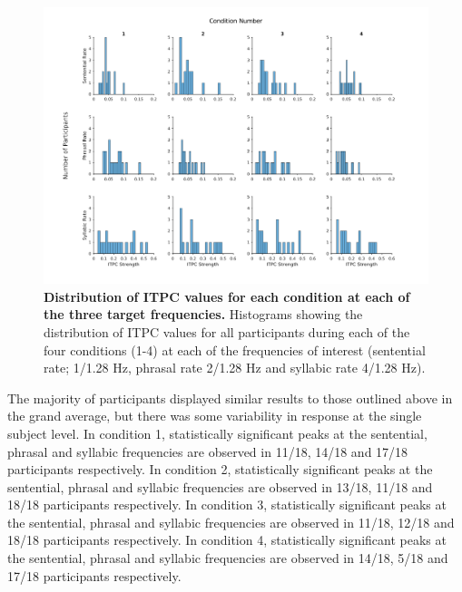 \documentclass[10pt,letterpaper]{article}
\begin{document}

\begin{figure}[tbhp]
\includegraphics[width=\linewidth]{ITPC_Distributions.png}
\caption{\textbf{Distribution of ITPC values for each condition at each of the three target frequencies.} Histograms showing the distribution of ITPC values for all participants during each of the four conditions (1-4) at each of the frequencies of interest (sentential rate; 1/1.28 Hz, phrasal rate 2/1.28 Hz and syllabic rate 4/1.28 Hz).}
\label{ITPC_Distribution}
\end{figure}

The majority of participants displayed similar results to those outlined above in the grand average, but there was some variability in response at the single subject level. In condition 1, statistically significant peaks at the sentential, phrasal and syllabic frequencies are observed in 11/18,
14/18 and 17/18 participants respectively. In
condition 2, statistically significant peaks at the sentential,
phrasal and syllabic frequencies are observed in 13/18, 11/18 and
18/18 participants respectively. In condition 3,
statistically significant peaks at the sentential, phrasal and
syllabic frequencies are observed in 11/18, 12/18 and 18/18
participants respectively. In condition 4,
statistically significant peaks at the sentential, phrasal and
syllabic frequencies are observed in 14/18, 5/18 and 17/18
participants respectively.
\end{document}
